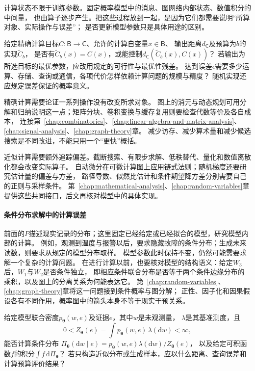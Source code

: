 计算状态不限于训练参数。固定概率模型中的消息、图网络内部状态、数值积分的中间量，
也由算子逐步产生。把这些过程放到一起，是因为它们都需要说明“所算对象、实际操作与误差”；
是否更新模型参数只是具体用途的区别。

\begin{mathproblem}
  \label{question:future-computation}
  给定精确计算目标$C:\mathsf B\to\mathsf C$、允许的计算自变量$x\in\mathsf B$、
  输出距离$d_{\mathsf C}$及预算为$b$的实现$\widetilde C_b$，
  是否有$\widetilde C_b(x)=C(x)$，或能控制$d_{\mathsf C}(\widetilde C_b(x),C(x))$？
  若输出为所选目标的最优参数，应改用规定的可行性与最优性残差。
  达到误差$\epsilon$需要多少运算、存储、查询或通信，各项代价怎样依赖计算问题的规模与精度？
  随机实现还应规定误差保证的概率意义。
\end{mathproblem}

精确计算需要论证一系列操作没有改变所求对象。
图上的消元与动态规划可用分解和归纳说明这一点；矩阵分块、卷积变换与缓存复用则要检查代数等价及各自成本，
连接第~\ref{chap:combinatorics}、\ref{chap:linear-algebra-and-matrix-analysis}、\ref{chap:signal-analysis}、\ref{chap:graph-theory}章。
减少访存、减少算术量和减少候选搜索是不同改进，不能只用一个“更快”概括。

近似计算需要额外追踪偏差。截断搜索、有限步求解、低秩替代、量化和数值离散化都会改变实际算子。
自动微分在可微计算图上应用链式法则；随机梯度还要研究估计量的偏差与方差，
路径导数、似然比估计和条件期望降方差分别需要自己的正则与采样条件。
第~\ref{chap:mathematical-analysis}、\ref{chap:random-variables}章提供这些共同接口，后文再核对模型中的具体实现。

\paragraph{条件分布求解中的计算误差}
\label{sec:future-analysis-probabilistic-query}

前面的$P$描述现实记录的分布；这里固定已经给定或已经拟合的模型，研究模型内部的计算。
例如，观测到温度与报警以后，要求隐藏故障的条件分布；生成未来读数，则要求从规定的模型分布取样。
模型参数此时保持不变，仍然可能需要求解一个复杂的计算问题。
在进行计算以前，也要核对模型的结构语义：给定$W_3$后，$W_1$与$W_2$是否条件独立，
即相应条件联合分布是否等于两个条件边缘分布的乘积，以及图上的分离关系为何能表达它。
第~\ref{chap:random-variables}、\ref{chap:graph-theory}章将这一问题接到条件概率与图分解；
正性、因子化和因果假设各有不同作用，概率图中的箭头本身不等于现实干预关系。

\begin{mathproblem}
  \label{question:future-probabilistic-query}
  给定模型联合密度$p_{\bm\theta}(w,e)$及证据$e$，其中$w$是未观测量，
  $\lambda$是其基准测度，且
  \[
    0<Z_{\bm\theta}(e)=\int p_{\bm\theta}(w,e)\,\lambda(\mathrm dw)<\infty,
  \]
  能否计算条件分布
  $\Pi_{\bm\theta}(\mathrm dw\mid e)=p_{\bm\theta}(w,e)\lambda(\mathrm dw)/Z_{\bm\theta}(e)$，
  以及给定可积函数$f$的积分$\int f\,\mathrm d\Pi_{\bm\theta}$？
  若只构造近似分布或生成样本，应以什么距离、查询误差和计算预算评价结果？
\end{mathproblem}

